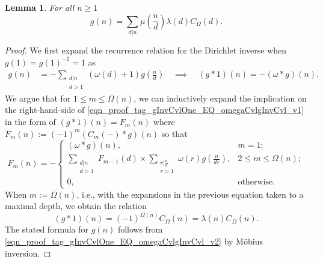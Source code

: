 \documentclass[11pt,reqno,a4letter]{article}
\numberwithin{equation}{section}
\numberwithin{figure}{section}
\numberwithin{table}{section}
\theoremstyle{plain}
\newtheorem{lemma}[theorem]{Lemma}
\numberwithin{theorem}{section}
\theoremstyle{definition}
\begin{document}
\begin{lemma} 
\label{lemma_AnExactFormulaFor_gInvByMobiusInv_v1} 
For all $n \geq 1$ 
\[
g(n) = \sum_{d|n} \mu\left(\frac{n}{d}\right) \lambda(d) C_{\Omega}(d). 
\]
\end{lemma}
\begin{proof} 
We first expand the recurrence relation for the Dirichlet inverse 
when $g(1) = g(1)^{-1} = 1$ as 
\begin{align} 
\label{eqn_proof_tag_gInvCvlOne_EQ_omegaCvlgInvCvl_v1} 
g(n) & = - \sum_{\substack{d|n \\ d>1}} (\omega(d) + 1) g\left(\frac{n}{d}\right) 
     \quad\implies\quad 
     (g \ast 1)(n) = -(\omega \ast g)(n). 
\end{align} 
We argue that for $1 \leq m \leq \Omega(n)$, we can inductively expand the 
implication on the right-hand-side of \eqref{eqn_proof_tag_gInvCvlOne_EQ_omegaCvlgInvCvl_v1} 
in the form of $(g \ast 1)(n) = F_m(n)$ where 
$F_m(n) := (-1)^{m} (C_m(-) \ast g)(n)$ so that 
\[
F_m(n) = - 
     \begin{cases} 
     (\omega \ast g)(n), & m = 1; \\ 
     \sum\limits_{\substack{d|n \\ d > 1}} F_{m-1}(d) \times \sum\limits_{\substack{r|\frac{n}{d} \\ r > 1}} 
     \omega(r) g\left(\frac{n}{dr}\right), & 2 \leq m \leq \Omega(n); \\ 
     0, & \text{otherwise.} 
     \end{cases} 
\]
When $m := \Omega(n)$, i.e., with the expansions 
in the previous equation taken to a maximal depth, we obtain the relation 
\begin{equation} 
\label{eqn_proof_tag_gInvCvlOne_EQ_omegaCvlgInvCvl_v2} 
(g \ast 1)(n) = (-1)^{\Omega(n)} C_{\Omega}(n) = \lambda(n) C_{\Omega}(n). 
\end{equation} 
The stated formula for $g(n)$ follows from 
\eqref{eqn_proof_tag_gInvCvlOne_EQ_omegaCvlgInvCvl_v2} 
by M\"obius inversion. 
\end{proof} 
\end{document}
